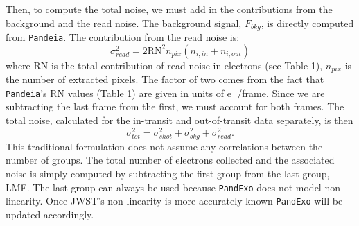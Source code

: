 \documentclass[iop]{emulateapj}
\begin{document}
Then, to compute the total noise, we must add in the contributions from the background and the read noise. The background signal, $F_{bkg}$, is directly computed from \texttt{Pandeia}. The contribution from the read noise is:
\begin{equation}
    \sigma_{read}^2 = 2\textrm{RN}^2 n_{pix} (n_{i,in} + n_{i,out})
\end{equation}
where RN is the total contribution of read noise in electrons (see Table 1), $n_{pix}$ is the number of extracted pixels. The factor of two comes from the fact that \texttt{Pandeia}'s RN values (Table 1) are given in units of e$^-$/frame. Since we are subtracting the last frame from the first, we must account for both frames.  The total noise, calculated for the in-transit and out-of-transit data separately, is then 
\begin{equation}
    \sigma_{tot}^2 = \sigma_{shot}^2 + \sigma_{bkg}^2 + \sigma_{read}^2.
\end{equation}
This traditional formulation does not assume any correlations between the number of groups. The total number of electrons collected and the associated noise is simply computed by subtracting the first group from the last group, LMF. The last group can always be used because \texttt{PandExo} does not model non-linearity. Once JWST's non-linearity is more accurately known \texttt{PandExo} will be updated accordingly. 
\end{document}
